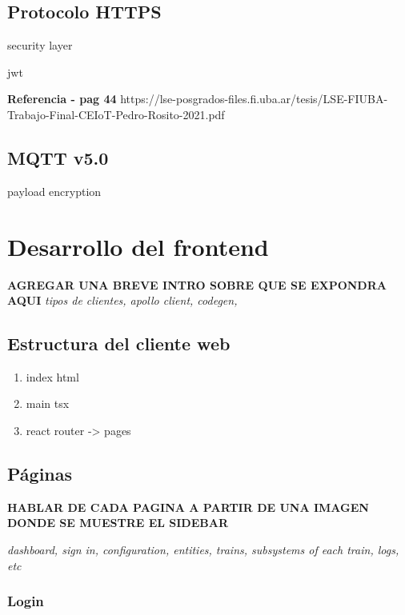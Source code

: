 \subsection{Protocolo HTTPS}

security layer

jwt

\textbf{Referencia - pag 44}
https://lse-posgrados-files.fi.uba.ar/tesis/LSE-FIUBA-Trabajo-Final-CEIoT-Pedro-Rosito-2021.pdf


\subsection{MQTT v5.0}

payload encryption



\section{Desarrollo del frontend}

\textbf{AGREGAR UNA BREVE INTRO SOBRE QUE SE EXPONDRA AQUI}
\textit{tipos de clientes, apollo client, codegen, }

\subsection{Estructura del cliente web}

\begin{enumerate}

  \item index html

  \item main tsx 

  \item react router -> pages

\end{enumerate}


\subsection{Páginas}

\textbf{HABLAR DE CADA PAGINA A PARTIR DE UNA IMAGEN DONDE SE MUESTRE EL SIDEBAR}

\textit{dashboard, sign in, configuration, entities, trains, subsystems of each train, logs, etc}

\subsubsection{Login}

